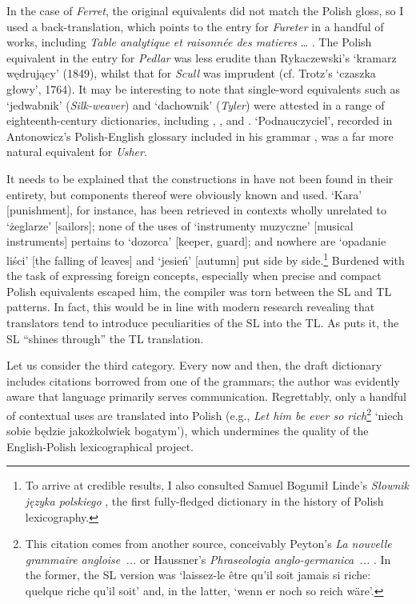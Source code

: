 \documentclass[output=paper,colorlinks,citecolor=brown,arabicfont,chinesefont]{langscibook}
\begin{document}
In the case of \emph{Ferret}, the original equivalents did not match the Polish gloss, so I used a back-translation, which points to the entry for \emph{Fureter} in a handful of works, including \emph{Table analytique et raisonnée des matieres} …  \citep{Noauthor1782}. The Polish equivalent in the entry for \emph{Pedlar} was less erudite than Rykaczewski’s ‘kramarz wędrujący’ (1849), whilst that for \emph{Scull} was imprudent (cf. Trotz’s ‘czaszka głowy’, 1764). It may be interesting to note that single-word equivalents such as ‘jedwabnik’ (\emph{Silk-weaver}) and ‘dachownik’ (\emph{Tyler}) were attested in a range of eighteenth-century dictionaries, including \citet{DanetKola1743}, \citet{Trotz1744}, and \citet{Eberlein_christian1763}. ‘Podnauczyciel’, recorded in Antonowicz’s Polish-English glossary included in his grammar \citep{Antonowicz1788}, was a far more natural equivalent for \emph{Usher}.

It needs to be explained that the constructions in  have not been found in their entirety, but components thereof were obviously known and used. ‘Kara’ [punishment], for instance, has been retrieved in contexts wholly unrelated to ‘żeglarze’ [sailors]; none of the uses of ‘instrumenty muzyczne’ [musical instruments] pertains to ‘dozorca’ [keeper, guard]; and nowhere are ‘opadanie liści’ [the falling of leaves] and ‘jesień’ [autumn] put side by side.\footnote{To arrive at credible results, I also consulted Samuel Bogumił Linde’s \emph{Słownik języka polskiego} \citep{Linde_samuel_b1807}, the first fully-fledged dictionary in the history of Polish lexicography.} Burdened with the task of expressing foreign concepts, especially when precise and compact Polish equivalents escaped him, the compiler was torn between the SL and TL patterns. In fact, this would be in line with modern research revealing that translators tend to introduce peculiarities of the SL into the TL. As \citet[222]{Teich_elke2003} puts it, the SL “shines through” the TL translation.




Let us consider the third category. Every now and then, the draft dictionary includes citations borrowed from one of the grammars; the author was evidently aware that language primarily serves communication. Regrettably, only a handful of contextual uses are translated into Polish (e.g., \emph{Let him be ever so rich}\footnote{This citation comes from another source, conceivably Peyton’s \emph{La nouvelle grammaire angloise~...} \citep{Peyton_vj1767} or Haussner’s \emph{Phraseologia anglo-germanica~...} \citep{Haussner_friedrich_w1798}. In the former, the SL version was ‘laissez-le être qu'il soit jamais si riche: quelque riche qu'il soit’ and, in the latter, ‘wenn er noch so reich wäre’.} ‘niech sobie będzie jakożkolwiek bogatym’), which undermines the quality of the English-Polish lexicographical project.
\end{document}
